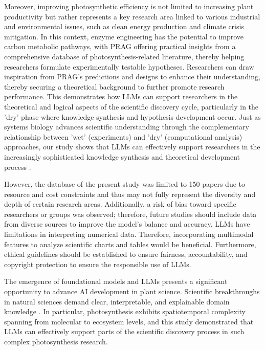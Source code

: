 \documentclass[12pt]{article}
\begin{document}
Moreover, improving photosynthetic efficiency is not limited to increasing plant productivity but rather represents a key research area linked to various industrial and environmental issues, such as clean energy production and climate crisis mitigation. In this context, enzyme engineering has the potential to improve carbon metabolic pathways, with PRAG offering practical insights from a comprehensive database of photosynthesis-related literature, thereby helping researchers formulate experimentally testable hypotheses. Researchers can draw inspiration from PRAG's predictions and designs to enhance their understanding, thereby securing a theoretical background to further promote research performance. This demonstrates how LLMs can support researchers in the theoretical and logical aspects of the scientific discovery cycle, particularly in the 'dry' phase where knowledge synthesis and hypothesis development occur. Just as systems biology advances scientific understanding through the complementary relationship between 'wet' (experiments) and 'dry' (computational analysis) approaches, our study shows that LLMs can effectively support researchers in the increasingly sophisticated knowledge synthesis and theoretical development process \cite{ref29}.

However, the database of the present study was limited to 150 papers due to resource and cost constraints and thus may not fully represent the diversity and depth of certain research areas. Additionally, a risk of bias toward specific researchers or groups was observed; therefore, future studies should include data from diverse sources to improve the model’s balance and accuracy. LLMs have limitations in interpreting numerical data. Therefore, incorporating multimodal features to analyze scientific charts and tables would be beneficial. Furthermore, ethical guidelines should be established to ensure fairness, accountability, and copyright protection to ensure the responsible use of LLMs.

The emergence of foundational models and LLMs presents a significant opportunity to advance AI development in plant science. Scientific breakthroughs in natural sciences demand clear, interpretable, and explainable domain knowledge \cite{ref30}. In particular, photosynthesis exhibits spatiotemporal complexity spanning from molecular to ecosystem levels, and this study demonstrated that LLMs can effectively support parts of the scientific discovery process in such complex photosynthesis research.
\end{document}
